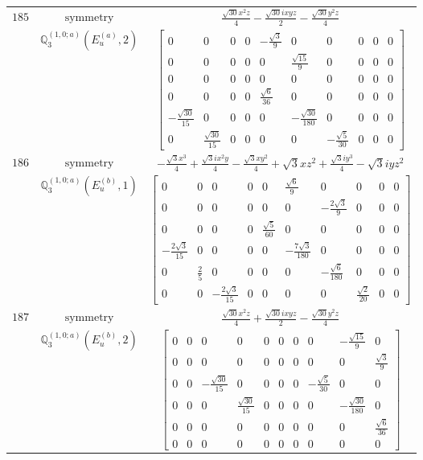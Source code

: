 \documentclass[fleqn,8pt,landscape]{jsarticle}
\begin{document}
\begin{longtable}{ccc}
$ 185 $ & $ \text{symmetry} $ & $ \frac{\sqrt{30} x^{2} z}{4} - \frac{\sqrt{30} i x y z}{2} - \frac{\sqrt{30} y^{2} z}{4} $ \\
$  $ & $ \mathbb{Q}_{3}^{(1,0;a)}(E_{u}^{(a)},2) $ & $ \begin{bmatrix} 0 & 0 & 0 & 0 & - \frac{\sqrt{3}}{9} & 0 & 0 & 0 & 0 & 0 \\ 0 & 0 & 0 & 0 & 0 & \frac{\sqrt{15}}{9} & 0 & 0 & 0 & 0 \\ 0 & 0 & 0 & 0 & 0 & 0 & 0 & 0 & 0 & 0 \\ 0 & 0 & 0 & 0 & \frac{\sqrt{6}}{36} & 0 & 0 & 0 & 0 & 0 \\ - \frac{\sqrt{30}}{15} & 0 & 0 & 0 & 0 & - \frac{\sqrt{30}}{180} & 0 & 0 & 0 & 0 \\ 0 & \frac{\sqrt{30}}{15} & 0 & 0 & 0 & 0 & - \frac{\sqrt{5}}{30} & 0 & 0 & 0 \end{bmatrix} $ \\ \hline
$ 186 $ & $ \text{symmetry} $ & $ - \frac{\sqrt{3} x^{3}}{4} + \frac{\sqrt{3} i x^{2} y}{4} - \frac{\sqrt{3} x y^{2}}{4} + \sqrt{3} x z^{2} + \frac{\sqrt{3} i y^{3}}{4} - \sqrt{3} i y z^{2} $ \\
$  $ & $ \mathbb{Q}_{3}^{(1,0;a)}(E_{u}^{(b)},1) $ & $ \begin{bmatrix} 0 & 0 & 0 & 0 & 0 & \frac{\sqrt{6}}{9} & 0 & 0 & 0 & 0 \\ 0 & 0 & 0 & 0 & 0 & 0 & - \frac{2 \sqrt{3}}{9} & 0 & 0 & 0 \\ 0 & 0 & 0 & 0 & \frac{\sqrt{5}}{60} & 0 & 0 & 0 & 0 & 0 \\ - \frac{2 \sqrt{3}}{15} & 0 & 0 & 0 & 0 & - \frac{7 \sqrt{3}}{180} & 0 & 0 & 0 & 0 \\ 0 & \frac{2}{5} & 0 & 0 & 0 & 0 & - \frac{\sqrt{6}}{180} & 0 & 0 & 0 \\ 0 & 0 & - \frac{2 \sqrt{3}}{15} & 0 & 0 & 0 & 0 & \frac{\sqrt{2}}{20} & 0 & 0 \end{bmatrix} $ \\ \hline
$ 187 $ & $ \text{symmetry} $ & $ \frac{\sqrt{30} x^{2} z}{4} + \frac{\sqrt{30} i x y z}{2} - \frac{\sqrt{30} y^{2} z}{4} $ \\
$  $ & $ \mathbb{Q}_{3}^{(1,0;a)}(E_{u}^{(b)},2) $ & $ \begin{bmatrix} 0 & 0 & 0 & 0 & 0 & 0 & 0 & 0 & - \frac{\sqrt{15}}{9} & 0 \\ 0 & 0 & 0 & 0 & 0 & 0 & 0 & 0 & 0 & \frac{\sqrt{3}}{9} \\ 0 & 0 & - \frac{\sqrt{30}}{15} & 0 & 0 & 0 & 0 & - \frac{\sqrt{5}}{30} & 0 & 0 \\ 0 & 0 & 0 & \frac{\sqrt{30}}{15} & 0 & 0 & 0 & 0 & - \frac{\sqrt{30}}{180} & 0 \\ 0 & 0 & 0 & 0 & 0 & 0 & 0 & 0 & 0 & \frac{\sqrt{6}}{36} \\ 0 & 0 & 0 & 0 & 0 & 0 & 0 & 0 & 0 & 0 \end{bmatrix} $ \\ \hline

\end{longtable}
\end{document}
